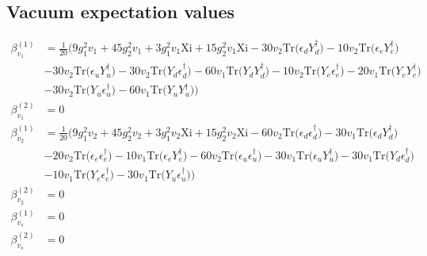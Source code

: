 \subsection{Vacuum expectation values}
{\allowdisplaybreaks  \begin{align} 
\beta_{v_1}^{(1)} & =  
\frac{1}{20} \Big(9 g_{1}^{2} v_1 +45 g_{2}^{2} v_1 +3 g_{1}^{2} v_1 \text{Xi} +15 g_{2}^{2} v_1 \text{Xi} -30 v_2 \mbox{Tr}\Big({\epsilon_d  Y_{d}^{\dagger}}\Big) -10 v_2 \mbox{Tr}\Big({\epsilon_e  Y_{e}^{\dagger}}\Big) \nonumber \\ 
 &-30 v_2 \mbox{Tr}\Big({\epsilon_u  Y_{u}^{\dagger}}\Big) -30 v_2 \mbox{Tr}\Big({Y_d  \epsilon_{d}^{\dagger}}\Big) -60 v_1 \mbox{Tr}\Big({Y_d  Y_{d}^{\dagger}}\Big) -10 v_2 \mbox{Tr}\Big({Y_e  \epsilon_{e}^{\dagger}}\Big) -20 v_1 \mbox{Tr}\Big({Y_e  Y_{e}^{\dagger}}\Big) \nonumber \\ 
 &-30 v_2 \mbox{Tr}\Big({Y_u  \epsilon_{u}^{\dagger}}\Big) -60 v_1 \mbox{Tr}\Big({Y_u  Y_{u}^{\dagger}}\Big) \Big)\\ 
\beta_{v_1}^{(2)} & =  
0\\ 
\beta_{v_2}^{(1)} & =  
\frac{1}{20} \Big(9 g_{1}^{2} v_2 +45 g_{2}^{2} v_2 +3 g_{1}^{2} v_2 \text{Xi} +15 g_{2}^{2} v_2 \text{Xi} -60 v_2 \mbox{Tr}\Big({\epsilon_d  \epsilon_{d}^{\dagger}}\Big) -30 v_1 \mbox{Tr}\Big({\epsilon_d  Y_{d}^{\dagger}}\Big) \nonumber \\ 
 &-20 v_2 \mbox{Tr}\Big({\epsilon_e  \epsilon_{e}^{\dagger}}\Big) -10 v_1 \mbox{Tr}\Big({\epsilon_e  Y_{e}^{\dagger}}\Big) -60 v_2 \mbox{Tr}\Big({\epsilon_u  \epsilon_{u}^{\dagger}}\Big) -30 v_1 \mbox{Tr}\Big({\epsilon_u  Y_{u}^{\dagger}}\Big) -30 v_1 \mbox{Tr}\Big({Y_d  \epsilon_{d}^{\dagger}}\Big) \nonumber \\ 
 &-10 v_1 \mbox{Tr}\Big({Y_e  \epsilon_{e}^{\dagger}}\Big) -30 v_1 \mbox{Tr}\Big({Y_u  \epsilon_{u}^{\dagger}}\Big) \Big)\\ 
\beta_{v_2}^{(2)} & =  
0\\ 
\beta_{v_s}^{(1)} & =  
0\\ 
\beta_{v_s}^{(2)} & =  
0
\end{align}} 
